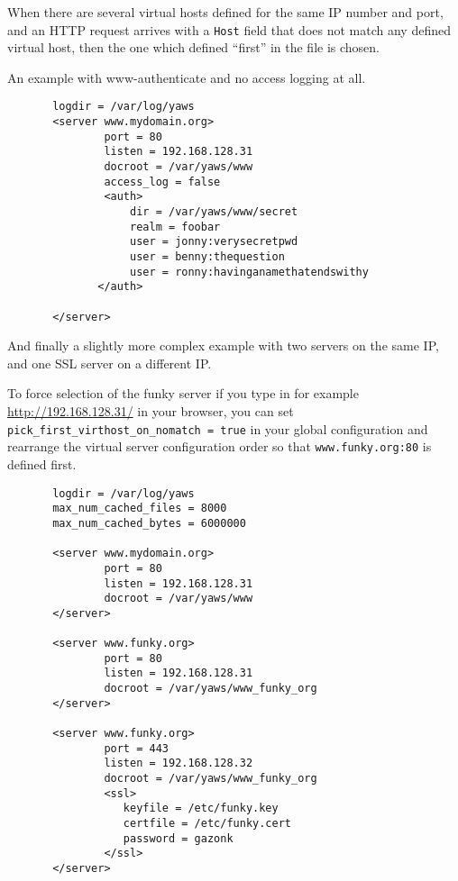 \documentclass[11pt,oneside,english]{book}
\begin{document}
When there are several virtual hosts defined for the same IP number
and port, and an HTTP request arrives with a \verb+Host+ field that
does not match any defined virtual host, then the one which defined
``first'' in the file is chosen.

An example with www-authenticate and no access logging at all.

\begin{verbatim}
       logdir = /var/log/yaws
       <server www.mydomain.org>
               port = 80
               listen = 192.168.128.31
               docroot = /var/yaws/www
               access_log = false
               <auth>
                   dir = /var/yaws/www/secret
                   realm = foobar
                   user = jonny:verysecretpwd
                   user = benny:thequestion
                   user = ronny:havinganamethatendswithy
              </auth>

       </server>
\end{verbatim}

       And  finally  a  slightly more complex example with
       two servers on the same IP, and one SSL server on a
       different IP.

       To force selection of the funky server if you type in for example
       \url{http://192.168.128.31/} in your browser, you can set
       \verb+pick_first_virthost_on_nomatch = true+ in your global
       configuration and rearrange the virtual server configuration order
       so that \verb+www.funky.org:80+ is defined first.


\begin{verbatim}
       logdir = /var/log/yaws
       max_num_cached_files = 8000
       max_num_cached_bytes = 6000000

       <server www.mydomain.org>
               port = 80
               listen = 192.168.128.31
               docroot = /var/yaws/www
       </server>

       <server www.funky.org>
               port = 80
               listen = 192.168.128.31
               docroot = /var/yaws/www_funky_org
       </server>

       <server www.funky.org>
               port = 443
               listen = 192.168.128.32
               docroot = /var/yaws/www_funky_org
               <ssl>
                  keyfile = /etc/funky.key
                  certfile = /etc/funky.cert
                  password = gazonk
               </ssl>
       </server>
\end{verbatim}
\end{document}
